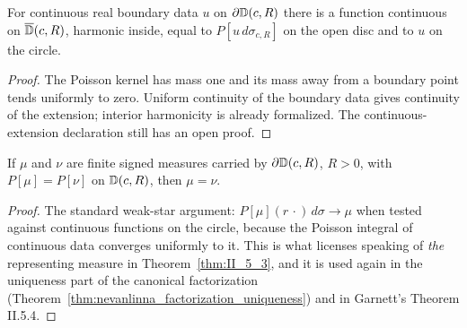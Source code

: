 \begin{theorem}
  \label{thm:poisson_extension}
  \leanok
  For continuous real boundary data $u$ on $\partial\mathbb{D}(c,R)$ there is a function
  continuous on $\overline{\mathbb{D}}(c,R)$, harmonic inside, equal to
  $P[u\,d\sigma_{c,R}]$ on the open disc and to $u$ on the circle.

  \begin{proof}
    \leanok
    The Poisson kernel has mass one and its mass away from a boundary
    point tends uniformly to zero. Uniform continuity of the boundary data
    gives continuity of the extension; interior harmonicity is already
    formalized. The continuous-extension declaration still has an open proof.
  \end{proof}
\end{theorem}

\begin{theorem}
  \label{thm:poisson_measure_unique}
  \leanok
  \mainline
  If $\mu$ and $\nu$ are finite signed measures carried by $\partial\mathbb{D}(c,R)$,
  $R>0$, with $P[\mu]=P[\nu]$ on $\mathbb{D}(c,R)$, then $\mu=\nu$.
  \begin{proof}
    \leanok
    The standard weak-star argument: $P[\mu](r\,\cdot)\,d\sigma\to\mu$ when
    tested against continuous functions on the circle, because the Poisson
    integral of continuous data converges uniformly to it. This is what
    licenses speaking of \emph{the} representing measure in
    Theorem~\ref{thm:II_5_3}, and it is used again in the uniqueness part of
    the canonical factorization
    (Theorem~\ref{thm:nevanlinna_factorization_uniqueness}) and in Garnett's
    Theorem II.5.4.
  \end{proof}
\end{theorem}

